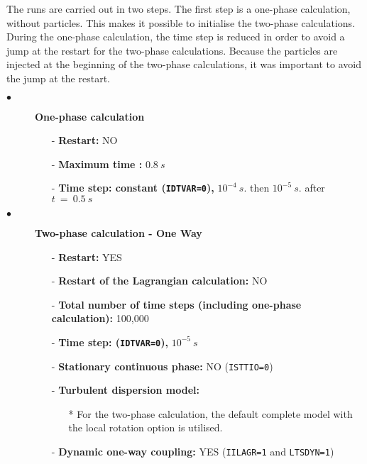 The runs are carried out in two steps. The first step is a one-phase calculation, without particles. This makes it possible to initialise the two-phase calculations. During the one-phase calculation, the time step is reduced in order to avoid a jump at the restart for the two-phase calculations. Because the particles are injected at the beginning of the two-phase calculations, it was important to avoid the jump at the restart. \\ 

\begin{description}

   \item[$\bullet$]\textbf{One-phase calculation}
         \begin{itemize}
            \item[-] {\bf Restart:} NO
            \item[-] {\bf Maximum time :} $0.8~s$
            \item[-] {\bf Time step: constant (\texttt{IDTVAR=0}), } $10^{-4}~s.$ then $10^{-5}~s.$ after $t~=~0.5~s$
         \end{itemize}


   \item[$\bullet$]\textbf{Two-phase calculation - One Way}
         \begin{itemize}
            \item[-] {\bf Restart:} YES
            \item[-] {\bf Restart of the Lagrangian calculation:} NO
            \item[-] {\bf Total number of time steps (including one-phase calculation):} 100,000
            \item[-] {\bf Time step: (\texttt{IDTVAR=0}),} $10^{-5}~s$
            \item[-] \textbf{Stationary continuous phase:} NO (\texttt{ISTTIO=0})

            \item[-] {\bf Turbulent dispersion model:}
                  \begin{itemize}
                     \item[*] For the two-phase calculation, the default complete model with the local rotation option is utilised.

                  \end{itemize}
            \item[-] {\bf Dynamic one-way coupling:} YES (\texttt{IILAGR=1} and \texttt{LTSDYN=1})


\end{itemize}
\end{description}
